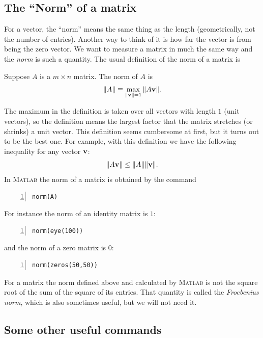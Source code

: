 

\subsection*{The ``Norm'' of a matrix}

For a vector, the ``norm'' means the same thing as the length (geometrically, not the number of entries).
Another way to think of it is how far the vector is from being
the zero vector.
We want to measure a matrix in much the same way and the {\em
norm} is such a quantity. The usual definition of the norm of
a matrix is
\begin{defn}
Suppose $A$ is a $m \times n$ matrix. The norm of $A$ is
$$
  \|A\| \equiv  \max_{\|\mathbf{v}\|=1} \|A\mathbf{v}\|.
$$
\end{defn}
The maximum in the definition is taken over all vectors with
length $1$ (unit vectors), so the definition means the largest
factor that the matrix stretches (or shrinks) a unit vector.
This definition seems cumbersome at first, but it
turns out to be the best one. For example, with this definition
we have the following inequality for any vector $\mathbf{v}$:
$$
    \|A\mathbf{v}\| \le \|A\| \|\mathbf{v}\|.
$$
In \textsc{Matlab} the norm of a matrix is obtained by the
command
\begin{lstlisting}[frame=none,numbers=left]
norm(A)
\end{lstlisting}
For instance the norm of an identity matrix is $1$:
\begin{lstlisting}[frame=none,numbers=left]
norm(eye(100))
\end{lstlisting}
and the norm of a zero matrix is $0$:
\begin{lstlisting}[frame=none,numbers=left]
norm(zeros(50,50))
\end{lstlisting}

For a matrix the norm defined above and calculated by
\textsc{Matlab} is not the square root of the sum
of the square of its entries. That quantity is called the
{\em Froebenius norm}, which is also sometimes useful,
but we will not need it.


\subsection*{Some other useful commands}

